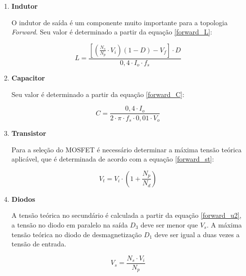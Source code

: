 \begin{apendicesenv}
\begin{enumerate}
\item \textbf{Indutor}
    
 O indutor de saída é um componente muito importante para a topologia \textit{Forward}. Seu valor é determinado a partir da equação \ref{forward_L}: 
    
    \begin{equation}
        L = \frac{\left[ \left( \frac{N_{s}}{N_{p}} \cdot V_{i} \right) \left( 1 - D \right) - V_{f} \right] \cdot D}{0,4 \cdot I_{o} \cdot f_{s}}
        \label{forward_L}
    \end{equation}
    
\item \textbf{Capacitor}   

Seu valor é determinado a partir da equação \ref{forward_C}: 
    
    \begin{equation}
        C = \frac{0,4 \cdot I_{o}}{2 \cdot \pi \cdot f_{s} \cdot 0,01 \cdot V_{o}}
        \label{forward_C}
    \end{equation}

\item \textbf{Transistor}

Para a seleção do MOSFET é necessário determinar a máxima tensão teórica aplicável, que é determinada de acordo com a equação \ref{forward_st}: 
    
    \begin{equation}
        V_{t} = V_{i} \cdot \left( 1 + \frac{N_{p}}{N_{d}} \right)
        \label{forward_st}
    \end{equation}

\item \textbf{Diodos}

A tensão teórica no secundário é calculada a partir da equação \ref{forward_u2}, a tensão no diodo em paralelo na saída $D_{3}$ deve ser menor que $V_{s}$. A máxima tensão teórica no diodo de desmagnetização $D_{1}$ deve ser igual a duas vezes a tensão de entrada. 


\begin{equation}
        V_{s} = \frac{N_{s} \cdot V_{i}}{N_{p}}
        \label{forward_u2}
    \end{equation}



\end{enumerate}
\end{apendicesenv}
